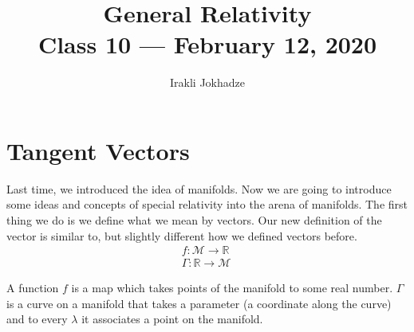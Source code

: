 \documentclass[11pt]{article}
\title{{\Huge General Relativity}\\{\Large{Class 10 --- February 12, 2020}}} %
\author{Irakli Jokhadze}
\begin{document}
\maketitle
\flushbottom
\newpage
\pagestyle{fancynotes}



\section{Tangent Vectors}
Last time, we introduced the idea of manifolds. Now we are going to introduce some ideas and concepts of special relativity into the arena of manifolds. The first thing we do is we define what we mean by vectors.
Our new definition of the vector is similar to, but slightly different how we defined vectors before. \\

\begin{align*}
f: \mathcal{M} \rightarrow \mathbb{R} \ \\
\Gamma: \mathbb{R} \rightarrow \mathcal{M} \ 
\end{align*}

A function $f$ is a map which takes points of the manifold to some real number. $\Gamma$ is a curve on a manifold that takes a parameter (a coordinate along the curve) and to every $\lambda$ it associates a point on the manifold.
\end{document}
